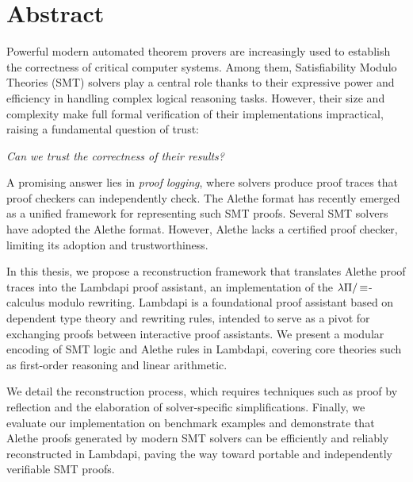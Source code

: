 \begingroup
\let\clearpage\relax
\let\cleardoublepage\relax
\let\cleardoublepage\relax

\chapter*{Abstract}
Powerful modern automated theorem provers are increasingly used to establish the correctness of critical computer systems.
Among them, Satisfiability Modulo Theories (SMT) solvers play a central role thanks to their expressive power and efficiency in handling complex logical reasoning tasks.
However, their size and complexity make full formal verification of their implementations impractical, raising a fundamental question of trust:
\begin{center}
\emph{Can we trust the correctness of their results?}
\end{center}

A promising answer lies in \emph{proof logging}, where solvers produce proof traces that proof checkers can independently check.
The Alethe format has recently emerged as a unified framework for representing such SMT proofs.
Several SMT solvers have adopted the Alethe format.
However, Alethe lacks a certified proof checker, limiting its adoption and trustworthiness.

In this thesis, we propose a reconstruction framework that translates Alethe proof traces into the Lambdapi proof assistant, an implementation of the $\lambda\Pi/\mathop{\equiv}$-calculus modulo rewriting.
Lambdapi is a foundational proof assistant based on dependent type theory and rewriting rules, intended to serve as a pivot for exchanging proofs between interactive proof assistants.
We present a modular encoding of SMT logic and Alethe rules in Lambdapi, covering core theories such as first-order reasoning and linear arithmetic.

We detail the reconstruction process, which requires techniques such as proof by reflection and the elaboration of solver-specific simplifications.
Finally, we evaluate our implementation on benchmark examples and demonstrate that Alethe proofs generated by modern SMT solvers can be efficiently and reliably reconstructed in Lambdapi, paving the way toward portable and independently verifiable SMT proofs.

\endgroup			

\vfill